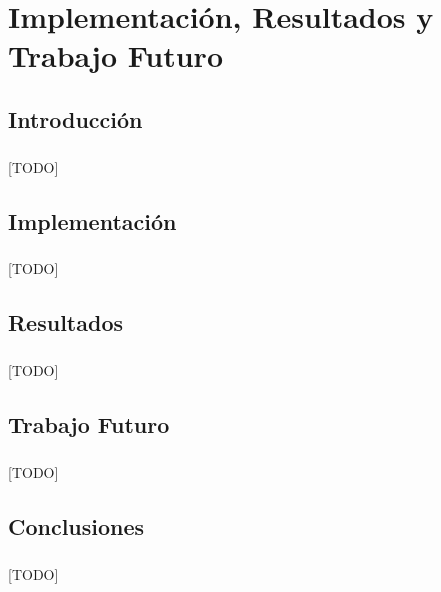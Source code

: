 \documentclass{subfiles}
\begin{document}
  \chapter{Implementación, Resultados y Trabajo Futuro}
  \label{chap:implementation}

    \section{Introducción}
    \label{sec:implementation_intro}

      \paragraph{}
      [TODO]

    \section{Implementación}
    \label{sec:implementation}

      \paragraph{}
      [TODO]

    \section{Resultados}
    \label{sec:implmentation_results}

      \paragraph{}
      [TODO]

    \section{Trabajo Futuro}
    \label{sec:future_work}

      \paragraph{}
      [TODO]

    \section{Conclusiones}
    \label{sec:implementation_conclusions}

      \paragraph{}
      [TODO]
\end{document}
